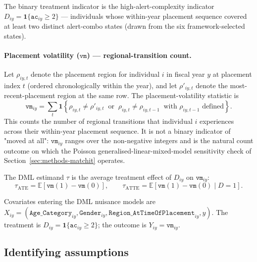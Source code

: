\documentclass[article,shortnames,nojss]{jss}
\renewcommand{\E}{\mathbb{E}}
\newcommand{\ac}{\texttt{ac}}
\newcommand{\vm}{\texttt{vm}}
\begin{document}
The binary treatment indicator is the high-alert-complexity indicator
$D_{iy} = \mathbf{1}\{\ac_{iy} \ge 2\}$ --- individuals whose
within-year placement sequence covered at least two distinct alert-combo
states (drawn from the six framework-selected states).

\paragraph{Placement volatility ($\vm$) — regional-transition count.}
Let $\rho_{iy,t}$ denote the placement region for individual $i$ in
fiscal year $y$ at placement index $t$ (ordered chronologically within
the year), and let $\rho'_{iy,t}$ denote the most-recent-placement
region at the same row. The placement-volatility statistic is
\begin{equation}
\label{eq:vm}
  \vm_{iy} = \sum_{t}
    \mathbf{1}\!\left\{
      \rho_{iy,t} \neq \rho'_{iy,t}
      \;\;\text{or}\;\;
      \rho_{iy,t} \neq \rho_{iy,t-1}
      \;\;\text{with $\rho_{iy,t-1}$ defined}
    \right\}.
\end{equation}
This counts the number of regional transitions that individual $i$
experiences across their within-year placement sequence. It is not a
binary indicator of "moved at all": $\vm_{iy}$ ranges over the
non-negative integers and is the natural count outcome on which the
Poisson generalised-linear-mixed-model sensitivity check of
Section~\ref{sec:methods-matchit} operates.

The DML estimand $\tau$ is the average treatment effect of $D_{iy}$
on $\vm_{iy}$:
\begin{equation}
  \tau_{\mathrm{ATE}} = \E[\vm(1) - \vm(0)], \qquad
  \tau_{\mathrm{ATTE}} = \E[\vm(1) - \vm(0) \mid D = 1].
\end{equation}

Covariates entering the DML nuisance models are
$X_{iy} = (\texttt{Age\_Category}_{iy}, \texttt{Gender}_{iy},
\texttt{Region\_AtTimeOfPlacement}_{iy}, y)$. The treatment is
$D_{iy} = \mathbf{1}\{\ac_{iy} \ge 2\}$; the outcome is
$Y_{iy} = \vm_{iy}$.

\subsection{Identifying assumptions}
\label{sec:methods-id}
\end{document}
